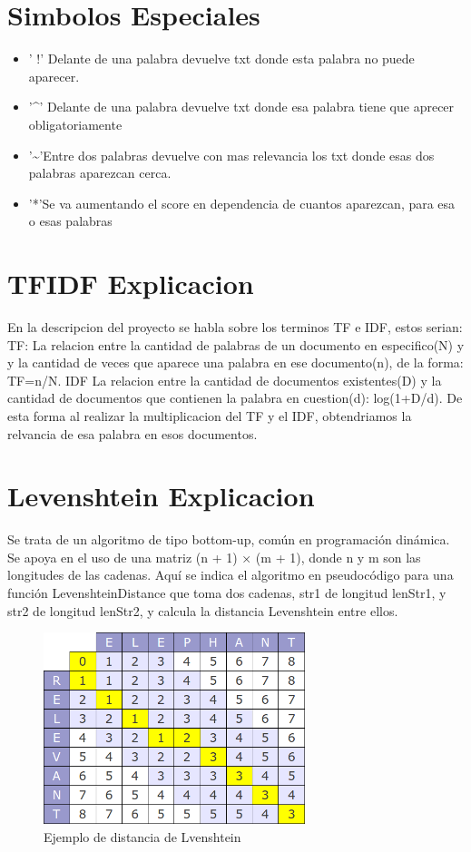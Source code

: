 \documentclass{article}
\begin{document}
\section*{Simbolos Especiales}
\begin{itemize}
    \item ' !' Delante de una palabra devuelve txt donde esta palabra no puede aparecer.
    \item  '\^{}' Delante de una palabra devuelve txt donde esa palabra tiene que aprecer obligatoriamente
    \item  '\~{}'Entre dos palabras devuelve con mas relevancia los txt donde esas dos palabras aparezcan cerca.
    \item   '*'Se va aumentando el score en dependencia de cuantos aparezcan, para esa o esas palabras
\end{itemize}
\section*{TFIDF Explicacion}
En la descripcion del proyecto se habla sobre los terminos TF e IDF, estos serian: TF: La relacion entre la cantidad de palabras de un documento en especifico(N) y y la cantidad de veces que aparece una palabra en ese documento(n), de la forma: TF=n/N. IDF La relacion entre la cantidad de documentos existentes(D) y la cantidad de documentos que contienen la palabra en cuestion(d): log(1+D/d). De esta forma al realizar la multiplicacion del TF y el IDF, obtendriamos la relvancia de esa palabra en esos documentos.
\section*{Levenshtein Explicacion}
Se trata de un algoritmo de tipo bottom-up, común en programación dinámica. Se apoya en el uso de una matriz (n + 1) × (m + 1), donde n y m son las longitudes de las cadenas. Aquí se indica el algoritmo en pseudocódigo para una función LevenshteinDistance que toma dos cadenas, str1 de longitud lenStr1, y str2 de longitud lenStr2, y calcula la distancia Levenshtein entre ellos.
\begin{figure}[h]
    \centering
	\includegraphics[width=0.68\textwidth]{imagenes/diagrama.png}
    \caption{Ejemplo de distancia de Lvenshtein}
    \label{img:3}
\end{figure}
\end{document}
